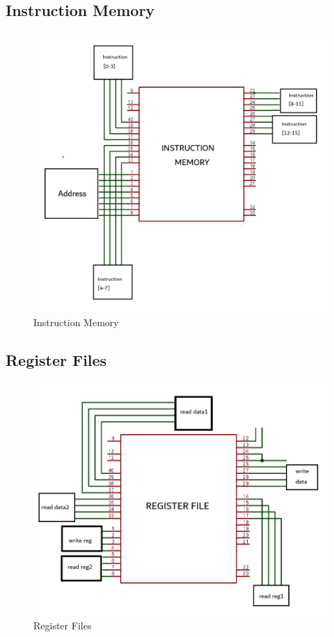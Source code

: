 \documentclass{article}
\begin{document}
		\newpage
		
		\subsection{Instruction Memory}
		
		\begin{figure}[h]
			\centering
			\includegraphics[scale=0.9]{images/im.png}
			\caption{Instruction Memory}
			\label{fig:enter-label}
		\end{figure}
		
		\newpage
		
		\subsection{Register Files}
		
		\begin{figure}[h]
			\centering
			\includegraphics[scale=0.9]{images/rf.png}
			\caption{Register Files}
			\label{fig:enter-label}
		\end{figure}
		
\end{document}
